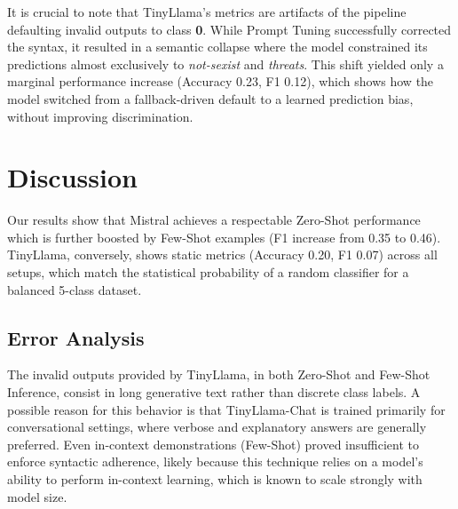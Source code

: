 \documentclass[11pt]{article}
\begin{document}
It is crucial to note that TinyLlama's metrics are artifacts of the pipeline defaulting invalid outputs to class \textbf{0}. While Prompt Tuning successfully corrected the syntax, it resulted in a semantic collapse where the model constrained its predictions almost exclusively to \textit{not-sexist} and \textit{threats}.
This shift yielded only a marginal performance increase (Accuracy 0.23, F1 0.12), which shows how the model switched from a fallback-driven default to a learned prediction bias, without improving discrimination.


\section{Discussion}
\label{sec:discussion}




Our results show that Mistral achieves a respectable Zero-Shot performance which is further boosted by Few-Shot examples (F1 increase from 0.35 to 0.46). TinyLlama, conversely, shows static metrics (Accuracy 0.20, F1 0.07) across all setups, which match the statistical probability of a random classifier for a balanced 5-class dataset.

\subsection{Error Analysis}

The invalid outputs provided by TinyLlama, in both Zero-Shot and Few-Shot Inference, consist in long generative text rather than discrete class labels. A possible reason for this behavior is that TinyLlama-Chat is trained primarily for conversational settings, where verbose and explanatory answers are generally preferred. Even in-context demonstrations (Few-Shot) proved insufficient to enforce syntactic adherence, likely because this technique relies on a model’s ability to perform in-context learning, which is known to scale strongly with model size.
\end{document}
